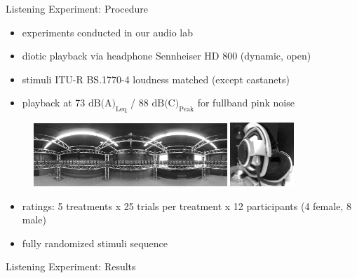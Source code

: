 \documentclass[mathserif]{intbeamer}
\begin{document}
\begin{frame}{Listening Experiment: Procedure}
\begin{itemize}
\item experiments conducted in our audio lab %
\item diotic playback via \textcolor{colnonzero}{headphone} Sennheiser HD 800 (dynamic, open)
\item stimuli ITU-R BS.1770-4 loudness matched (except castanets)
\item playback at 73 $\text{dB(A)}_\text{Leq}$ / 88 $\text{dB(C)}_\text{Peak}$
for fullband pink noise
\end{itemize}
\begin{figure}
\includegraphics[width=0.65\textwidth]{graphics/URO_array_panorama_2}
\includegraphics[width=0.215\textwidth]{graphics/HD800_2}
\end{figure}
\begin{itemize}
\item ratings: 5 treatments x 25 trials per treatment x 12 participants (4 female, 8 male)
\item fully randomized stimuli sequence
\end{itemize}
\end{frame}
%
%
%
\begin{frame}{Listening Experiment: Results}
\end{frame}
%
%
%
\end{document}
